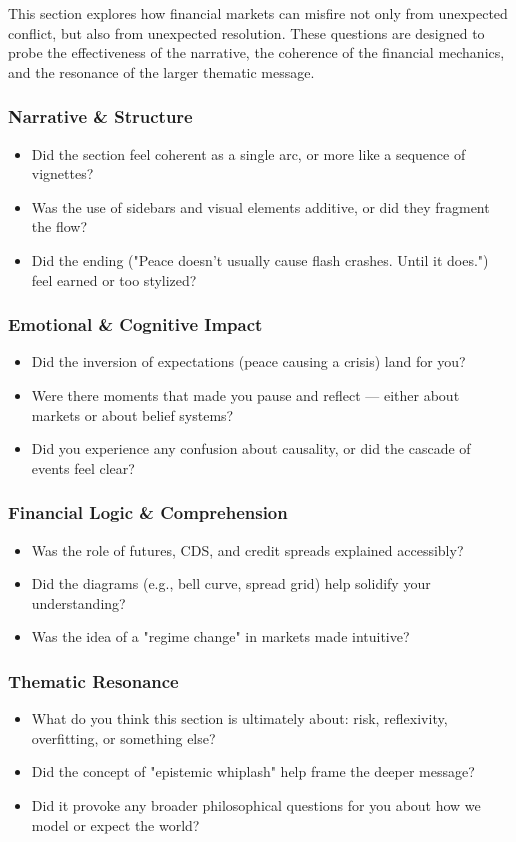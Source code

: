 This section explores how financial markets can misfire not only from unexpected conflict, but also from unexpected resolution. These questions are designed to probe the effectiveness of the narrative, the coherence of the financial mechanics, and the resonance of the larger thematic message.

\subsubsection{Narrative \& Structure}
\begin{itemize}
  \item Did the section feel coherent as a single arc, or more like a sequence of vignettes?
  \item Was the use of sidebars and visual elements additive, or did they fragment the flow?
  \item Did the ending ("Peace doesn’t usually cause flash crashes. Until it does.") feel earned or too stylized?
\end{itemize}

\subsubsection{Emotional \& Cognitive Impact}
\begin{itemize}
  \item Did the inversion of expectations (peace causing a crisis) land for you?
  \item Were there moments that made you pause and reflect — either about markets or about belief systems?
  \item Did you experience any confusion about causality, or did the cascade of events feel clear?
\end{itemize}

\subsubsection{Financial Logic \& Comprehension}
\begin{itemize}
  \item Was the role of futures, CDS, and credit spreads explained accessibly?
  \item Did the diagrams (e.g., bell curve, spread grid) help solidify your understanding?
  \item Was the idea of a "regime change" in markets made intuitive?
\end{itemize}

\subsubsection{Thematic Resonance}
\begin{itemize}
  \item What do you think this section is ultimately about: risk, reflexivity, overfitting, or something else?
  \item Did the concept of "epistemic whiplash" help frame the deeper message?
  \item Did it provoke any broader philosophical questions for you about how we model or expect the world?
\end{itemize}

